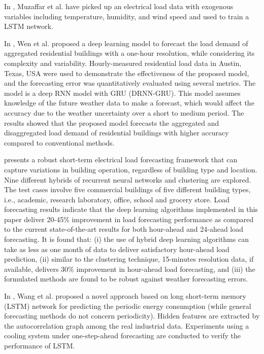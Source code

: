 In \cite{MUZAFFAR20192922}, Muzaffar et al. have picked up an electrical load data with exogenous variables including temperature, humidity, and wind speed and used to train a LSTM network. 

In \cite{WEN2020106073}, Wen et al. proposed a deep learning model to forecast the load demand of aggregated residential buildings with a one-hour resolution, while considering its complexity and variability.
Hourly-measured residential load data in Austin, Texas, USA were used to demonstrate the effectiveness of the proposed model, and the forecasting error was quantitatively evaluated using several metrics.
The model is a deep RNN model with GRU (DRNN-GRU).
This model assumes knowledge of the future weather data to make a forecast, which would affect the accuracy due to the weather uncertainty over a short to medium period.
The results showed that the proposed model forecasts the aggregated and disaggregated load demand of residential buildings with higher accuracy compared to conventional methods.

\cite{CHITALIA2020115410} presents a robust short-term electrical load forecasting framework that can capture variations in building operation, regardless of building type and location.
Nine different hybrids of recurrent neural networks and clustering are explored.
The test cases involve five commercial buildings of five different building types, i.e., academic, research laboratory, office, school and grocery store.
Load forecasting results indicate that the deep learning algorithms implemented in this paper deliver 20-45\% improvement in load forecasting performance as compared to the current state-of-the-art results for both hour-ahead and 24-ahead load forecasting.
It is found that:
(i) the use of hybrid deep learning algorithms can take as less as one month of data to deliver satisfactory hour-ahead load prediction,
(ii) similar to the clustering technique, 15-minutes resolution data, if available, delivers 30\% improvement in hour-ahead load forecasting,
and (iii) the formulated methods are found to be robust against weather forecasting errors.

In \cite{WANG2020117197}, Wang et al. proposed a novel approach based on long short-term memory (LSTM) network for predicting the periodic energy consumption (while general forecasting methods do not concern periodicity).
Hidden features are extracted by the autocorrelation graph among the real industrial data.
Experiments using a cooling system under one-step-ahead forecasting are conducted to verify the performance of LSTM.

